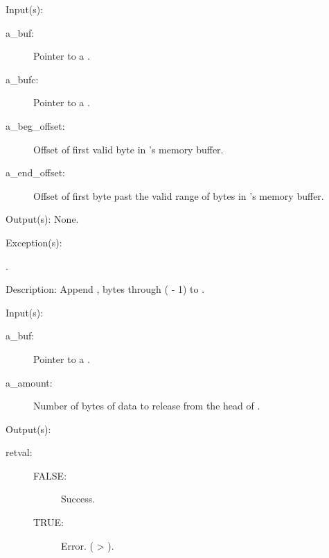 \begin{capi}
\begin{capilist}
	\item[Input(s): ]
		\begin{description}\item[]
		\item[a\_buf: ]
			Pointer to a .
		\item[a\_bufc: ]
			Pointer to a .
		\item[a\_beg\_offset: ]
			Offset of first valid byte in 's memory
			buffer.
		\item[a\_end\_offset: ]
			Offset of first byte past the valid range of bytes in
			's memory buffer.
		\end{description}
	\item[Output(s): ] None.
	\item[Exception(s): ]
		\begin{description}\item[]
		\item[.]
		\end{description}
	\item[Description: ]
		Append , bytes  through
		( - 1) to .
	\end{capilist}
\label{buf_head_data_release}
	\begin{capilist}
	\item[Input(s): ]
		\begin{description}\item[]
		\item[a\_buf: ]
			Pointer to a .
		\item[a\_amount: ]
			Number of bytes of data to release from the head of
			.
		\end{description}
	\item[Output(s): ]
		\begin{description}\item[]
		\item[retval: ]
			\begin{description}\item[]
			\item[FALSE: ]
				 Success.
			\item[TRUE: ]
				 Error.  ( >
				).
			\end{description}

\end{description}
\end{capilist}
\end{capi}
